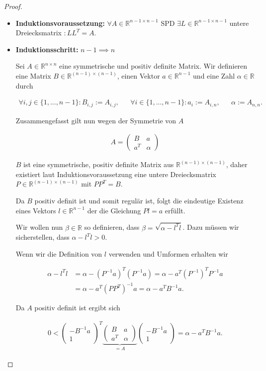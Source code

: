 \documentclass[titlepage]{article}
\begin{document}
\begin{proof}
\begin{itemize}
		\item \textbf{Induktionsvoraussetzung:} $\forall A \in \mathbb{R}^{n - 1 \times n - 1}$ SPD $\exists L \in \mathbb{R}^{n - 1\times n - 1}$ untere Dreiecksmatrix $:LL^T=A$.
		
		\item \textbf{Induktionsschritt:} $n-1 \implies n$
		
		Sei $A \in \mathbb{R}^{n\times n}$ eine symmetrische und positiv definite Matrix. Wir definieren eine Matrix $B \in \mathbb{R}^{(n-1)\times(n-1)}$, einen Vektor $a \in \mathbb{R}^{n-1}$ und eine Zahl $\alpha \in \mathbb{R}$ durch
		
		\begin{align*}
			\forall i, j \in \{1, ..., n - 1\}: B_{i,j} := A_{i,j}, && \forall i \in \{1, ..., n - 1\}: a_i := A_{i,n}, && \alpha := A_{n,n}.
		\end{align*}
		
		Zusammengefasst gilt nun wegen der Symmetrie von $A$
		
		\begin{align*}
			A = \begin{pmatrix}
				B & a \\
				a^T & \alpha
			\end{pmatrix}
		\end{align*}
	
		$B$ ist eine symmetrische, positiv definite Matrix aus $\mathbb{R}^{(n-1)\times(n-1)}$, daher existiert laut Induktionsvoraussetzung eine untere Dreiecksmatrix $P \in \mathbb{R}^{(n-1)\times(n-1)}$ mit $PP^T=B$.
		
		Da $B$ positiv definit ist und somit regulär ist, folgt die eindeutige Existenz eines Vektors $l \in \mathbb{R}^{n-1}$ der die Gleichung $Pl=a$ erfüllt.
		
		Wir wollen nun $\beta \in \mathbb{R}$ so definieren, dass $\beta = \sqrt{\alpha - l^Tl}$. Dazu müssen wir sicherstellen, dass $\alpha - l^Tl > 0$.
		
		Wenn wir die Definition von $l$ verwenden und Umformen erhalten wir
		
		\begin{align*}
			\alpha - l^Tl &= \alpha - (P^{-1}a)^T(P^{-1}a) = \alpha - a^T (P^{-1})^TP^{-1}a \\
			&= \alpha - a^T (PP^T)^{-1}a = \alpha - a^T B^{-1}a.
		\end{align*}
	
		Da $A$ positiv definit ist ergibt sich
	
		\begin{align*}
			0 < \begin{pmatrix}
				-B^{-1}a\\
				1
			\end{pmatrix}^T
			\underbrace{\begin{pmatrix}
				B & a\\
				a^T & \alpha
			\end{pmatrix}}_{=A}
			\begin{pmatrix}
				-B^{-1}a\\
				1
			\end{pmatrix} =
			\alpha - a^T B^{-1} a.
		\end{align*}
	

\end{itemize}
\end{proof}
\end{document}
